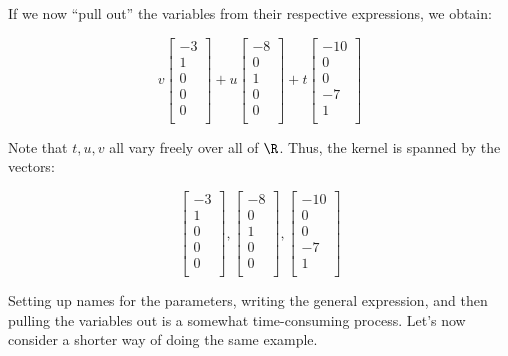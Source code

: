 \documentclass[10pt]{amsart}
\begin{document}
If we now ``pull out'' the variables from their respective
expressions, we obtain:

$$v \left[\begin{matrix} -3 \\ 1 \\ 0 \\ 0 \\ 0 \\\end{matrix}\right] + u \left[\begin{matrix} -8 \\ 0 \\ 1 \\ 0 \\ 0 \\\end{matrix}\right] + t \left[\begin{matrix} -10 \\ 0 \\ 0 \\ -7 \\ 1 \\\end{matrix}\right]$$

Note that $t,u,v$ all vary freely over all of $\R$. Thus, the kernel
is spanned by the vectors:

$$\left[\begin{matrix} -3 \\ 1 \\ 0 \\ 0 \\ 0 \\\end{matrix}\right], \left[\begin{matrix} -8 \\ 0 \\ 1 \\ 0 \\ 0 \\\end{matrix}\right], \left[\begin{matrix} -10 \\ 0 \\ 0 \\ -7 \\ 1 \\\end{matrix}\right]$$

Setting up names for the parameters, writing the general expression,
and then pulling the variables out is a somewhat time-consuming
process. Let's now consider a shorter way of doing the same example.
\end{document}
